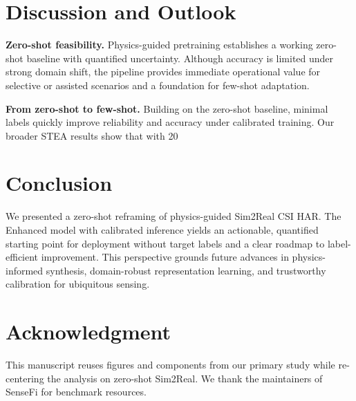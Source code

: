 \documentclass[journal]{IEEEtran}
\begin{document}
\section{Discussion and Outlook}
\textbf{Zero-shot feasibility.} Physics-guided pretraining establishes a working zero-shot baseline with quantified uncertainty. Although accuracy is limited under strong domain shift, the pipeline provides immediate operational value for selective or assisted scenarios and a foundation for few-shot adaptation.

\textbf{From zero-shot to few-shot.} Building on the zero-shot baseline, minimal labels quickly improve reliability and accuracy under calibrated training. Our broader STEA results show that with 20%

\section{Conclusion}
We presented a zero-shot reframing of physics-guided Sim2Real CSI HAR. The Enhanced model with calibrated inference yields an actionable, quantified starting point for deployment without target labels and a clear roadmap to label-efficient improvement. This perspective grounds future advances in physics-informed synthesis, domain-robust representation learning, and trustworthy calibration for ubiquitous sensing.

\section*{Acknowledgment}
This manuscript reuses figures and components from our primary study while re-centering the analysis on zero-shot Sim2Real. We thank the maintainers of SenseFi for benchmark resources.



\end{document}
